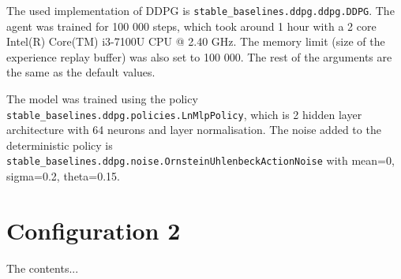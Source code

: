 \documentclass[class=book, crop=false, 11pt]{standalone}
\begin{document}
The used implementation of DDPG is \texttt{stable\_baselines.ddpg.ddpg.DDPG}. The agent was trained for 100 000 steps, which took around 1 hour with a 2 core Intel(R) Core(TM) i3-7100U CPU @ 2.40 GHz. The memory limit (size of the experience replay buffer) was also set to 100 000. The rest of the arguments are the same as the default values. 

The model was trained using the policy \texttt{stable\_baselines.ddpg.policies.LnMlpPolicy}, which is 2 hidden layer architecture with 64 neurons and layer normalisation. The noise added to the deterministic policy is \texttt{stable\_baselines.ddpg.noise.OrnsteinUhlenbeckActionNoise} with mean=0, sigma=0.2, theta=0.15.  


\section{Configuration 2}
The contents...
\end{document}

